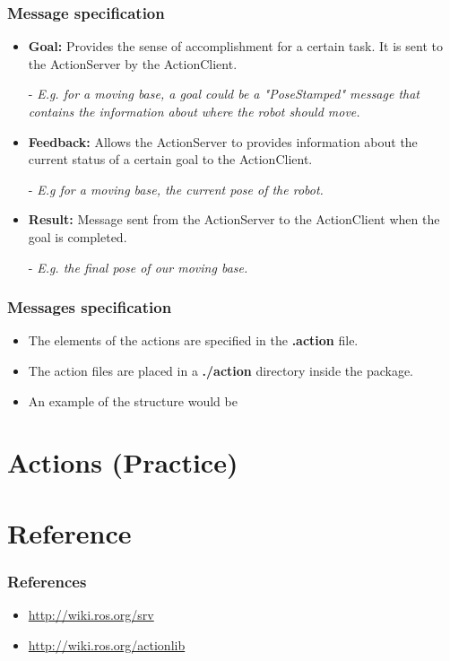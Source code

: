 \documentclass{beamer}
\begin{document}
	\begin{frame}
		\frametitle{Message specification}
		\begin{itemize}
			\item{\textbf{Goal: } Provides the sense of accomplishment for a certain task. It is sent to the ActionServer by the ActionClient.}
			\item[-]{ \textit{E.g. for a moving base, a goal could be a "PoseStamped" message that contains the information about where the robot should move.}}
			\item{\textbf{Feedback: } Allows the ActionServer to provides information about the current status of a certain goal to the ActionClient.}
			\item[-]{\textit{E.g for a moving base, the current pose of the robot.}}
			\item{\textbf{Result: } Message sent from the ActionServer to the ActionClient when the goal is completed.}
			\item[-]{\textit{E.g. the final pose of our moving base.}}
		\end{itemize}
	\end{frame}
	\begin{frame}
		\frametitle{Messages specification}
		\begin{itemize}
			\item{The elements of the actions are specified in the \textbf{.action} file.}
			\item{The action files are placed in a \textbf{./action} directory inside the package.}
			\item{An example of the structure would be}
			\sleepSort
		\end{itemize}
	\end{frame}
	\section{Actions (Practice)}
	\section{Reference}
	\begin{frame}
		\frametitle{References}
		\begin{itemize}
			\item{\url{http://wiki.ros.org/srv}}
			\item{\url{http://wiki.ros.org/actionlib}}
		\end{itemize}
	\end{frame}
\end{document}
